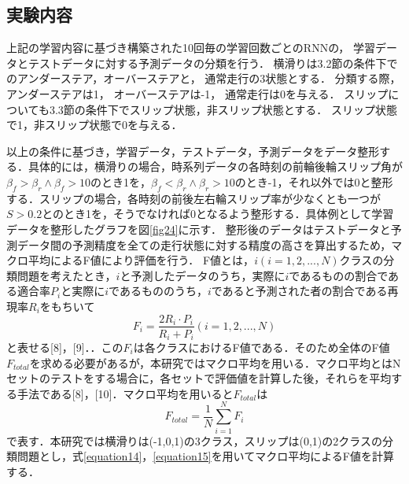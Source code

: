\documentclass[twocolumn]{jsarticle}
\begin{document}
\subsection{実験内容}
上記の学習内容に基づき構築された10回毎の学習回数ごとのRNNの，
学習データとテストデータに対する予測データの分類を行う．
横滑りは3.2節の条件下でのアンダーステア，オーバーステアと，
通常走行の3状態とする．
分類する際，アンダーステアは1，
オーバーステアは-1，
通常走行は0を与える．
スリップについても3.3節の条件下でスリップ状態，非スリップ状態とする．
スリップ状態で1，非スリップ状態で0を与える．

以上の条件に基づき，学習データ，テストデータ，予測データをデータ整形する．具体的には，横滑りの場合，時系列データの各時刻の前輪後輪スリップ角が$β_f > β_r \land β_f > 10$のとき1を，$β_f < β_r \land β_r > 10$のとき-1，それ以外では0と整形する．スリップの場合，各時刻の前後左右輪スリップ率が少なくとも一つが$S > 0.2$とのとき1を，そうでなければ0となるよう整形する．具体例として学習データを整形したグラフを図\ref{fig24}に示す．
整形後のデータはテストデータと予測データ間の予測精度を全ての走行状態に対する精度の高さを算出するため，マクロ平均によるF値により評価を行う．
F値とは，$i(i = 1,2,...,N)$クラスの分類問題を考えたとき，$i$と予測したデータのうち，実際に$i$であるものの割合である適合率$P_i$と実際に$i$であるもののうち，$i$であると予測された者の割合である再現率$R_i$をもちいて
   \begin{equation}
   \label{equation14}
      F_i = \frac{2R_i \cdot P_i}{R_i+P_i}(i = 1,2,...,N)
   \end{equation}
と表せる[8]，[9]．．この$F_i$は各クラスにおけるF値である．そのため全体のF値$F_{total}$を求める必要があるが，本研究ではマクロ平均を用いる．マクロ平均とはNセットのテストをする場合に，各セットで評価値を計算した後，それらを平均する手法である[8]，[10]．マクロ平均を用いると$F_{total}$は
   \begin{equation}
   \label{equation15}
     F_{total} = \frac{1}{N}\sum_{i=1}^N F_i
   \end{equation}
で表す．本研究では横滑りは(-1,0,1)の3クラス，スリップは(0,1)の2クラスの分類問題とし，式\ref{equation14}，\ref{equation15}を用いてマクロ平均によるF値を計算する．
\end{document}
